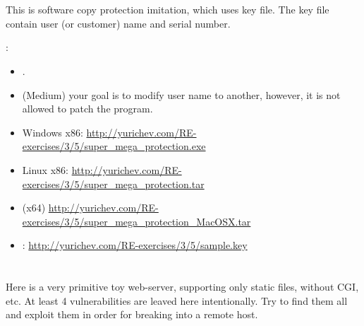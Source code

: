 \section{}

{This is software copy protection imitation, which uses key file}.
{The key file contain user (or customer) name and serial number}.

:

\begin{itemize}
\item
{}.

\item
{}
{(Medium) your goal is to modify user name to another, however, it is not allowed to patch the program}.
\end{itemize}

\begin{itemize}
\item Windows x86: \url{http://yurichev.com/RE-exercises/3/5/super_mega_protection.exe}
\item Linux x86: \url{http://yurichev.com/RE-exercises/3/5/super_mega_protection.tar}
\item \MacOSX (x64) \url{http://yurichev.com/RE-exercises/3/5/super_mega_protection_MacOSX.tar}
\item {}: \url{http://yurichev.com/RE-exercises/3/5/sample.key}
\end{itemize}

\section{}

{Here is a very primitive toy web-server, supporting only static files, without \ac{CGI}, etc}.
{At least 4 vulnerabilities are leaved here intentionally}.
{Try to find them all and exploit them in order for breaking into a remote host}.

